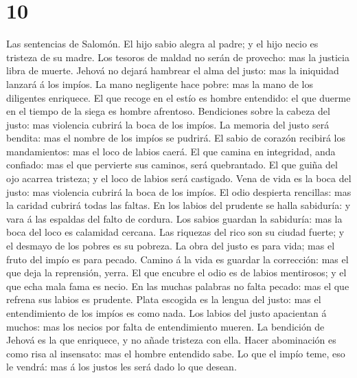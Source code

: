 \hypertarget{section-9}{%
\section{10}\label{section-9}}

 Las sentencias de Salomón. El hijo sabio alegra al padre;
y el hijo necio es tristeza de su madre.  Los tesoros de
maldad no serán de provecho: mas la justicia libra de muerte.
 Jehová no dejará hambrear el alma del justo: mas la
iniquidad lanzará á los impíos.  La mano negligente hace
pobre: mas la mano de los diligentes enriquece.  El que
recoge en el estío es hombre entendido: el que duerme en el tiempo de la
siega es hombre afrentoso.  Bendiciones sobre la cabeza
del justo: mas violencia cubrirá la boca de los impíos. 
La memoria del justo será bendita: mas el nombre de los impíos se
pudrirá.  El sabio de corazón recibirá los mandamientos:
mas el loco de labios caerá.  El que camina en integridad,
anda confiado: mas el que pervierte sus caminos, será quebrantado.
 El que guiña del ojo acarrea tristeza; y el loco de
labios será castigado.  Vena de vida es la boca del
justo: mas violencia cubrirá la boca de los impíos.  El
odio despierta rencillas: mas la caridad cubrirá todas las faltas.
 En los labios del prudente se halla sabiduría: y vara á
las espaldas del falto de cordura.  Los sabios guardan la
sabiduría: mas la boca del loco es calamidad cercana. 
Las riquezas del rico son su ciudad fuerte; y el desmayo de los pobres
es su pobreza.  La obra del justo es para vida; mas el
fruto del impío es para pecado.  Camino á la vida es
guardar la corrección: mas el que deja la reprensión, yerra.
 El que encubre el odio es de labios mentirosos; y el que
echa mala fama es necio.  En las muchas palabras no falta
pecado: mas el que refrena sus labios es prudente.  Plata
escogida es la lengua del justo: mas el entendimiento de los impíos es
como nada.  Los labios del justo apacientan á muchos: mas
los necios por falta de entendimiento mueren.  La
bendición de Jehová es la que enriquece, y no añade tristeza con ella.
 Hacer abominación es como risa al insensato: mas el
hombre entendido sabe.  Lo que el impío teme, eso le
vendrá: mas á los justos les será dado lo que desean. 
